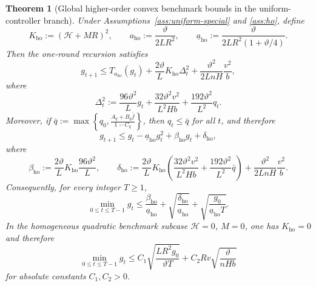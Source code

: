 \documentclass{article}
\newtheorem{theorem}{Theorem}[section]
\theoremstyle{definition}
\begin{document}
\begin{theorem}[Global higher-order convex benchmark bounds in the uniform-controller branch]
\label{th:ho-main}
Under Assumptions~\ref{ass:uniform-special} and \ref{ass:ho}, define
\[
K_{\mathrm{ho}}:=(\mathcal H+MR)^2,
\qquad
a_{\mathrm{ho}}:=\frac{\vartheta}{2LR^2},
\qquad
\underline a_{\mathrm{ho}}:=\frac{\vartheta}{2LR^2(1+\vartheta/4)}.
\]
Then the one-round recursion satisfies
\[
g_{t+1}
\le
T_{a_{\mathrm{ho}}}(g_t)
+
\frac{2\vartheta}{L}K_{\mathrm{ho}}\Delta_t^2
+
\frac{\vartheta^2}{2L n H}\frac{v^2}{b},
\]
where
\begin{equation}
\Delta_t^2
:=
\frac{96\vartheta^2}{L}g_t
+
\frac{32\vartheta^2 v^2}{L^2 H b}
+
\frac{192\vartheta^2}{L^2}q_t.
\label{eq:Delta-t-main}\end{equation}
Moreover, if $\bar q
:=
\max\left\{q_0,\frac{A_q+B_q\bar f}{1-C_q}\right\}$,
then $q_t\le \bar q$ for all $t$, and therefore
\begin{equation}
g_{t+1}
\le
g_t
-
\underline a_{\mathrm{ho}} g_t^2
+
\beta_{\mathrm{ho}} g_t
+
\delta_{\mathrm{ho}},
\label{eq:ho-rec-main}\end{equation}
where
\begin{equation}
\beta_{\mathrm{ho}}
:=
\frac{2\vartheta}{L}K_{\mathrm{ho}}\frac{96\vartheta^2}{L},
\qquad
\delta_{\mathrm{ho}}
:=
\frac{2\vartheta}{L}K_{\mathrm{ho}}
\left(
\frac{32\vartheta^2 v^2}{L^2 H b}+
\frac{192\vartheta^2}{L^2}\bar q
\right)
+
\frac{\vartheta^2}{2L n H}\frac{v^2}{b}.
\label{eq:ho-coeff-main}\end{equation}
Consequently, for every integer $T\ge 1$,
\begin{equation}
\min_{0\le t\le T-1} g_t
\le
\frac{\beta_{\mathrm{ho}}}{\underline a_{\mathrm{ho}}}
+
\sqrt{\frac{\delta_{\mathrm{ho}}}{\underline a_{\mathrm{ho}}}}
+
\sqrt{\frac{g_0}{\underline a_{\mathrm{ho}}T}}.
\label{eq:ho-explicit-main}\end{equation}
In the homogeneous quadratic benchmark subcase $\mathcal H=0$, $M=0$,
one has $K_{\mathrm{ho}}=0$ and therefore
\[
\min_{0\le t\le T-1} g_t
\le
C_1\sqrt{\frac{L R^2 g_0}{\vartheta T}}
+
C_2 R v\sqrt{\frac{\vartheta}{n H b}}
\]
for absolute constants $C_1,C_2>0$.
\end{theorem}
\end{document}
